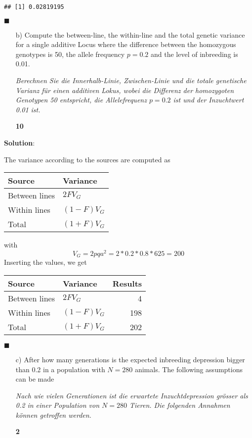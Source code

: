 \documentclass[
]{article}
\newcommand{\points}[1]
{\begin{flushright}\textbf{#1}\end{flushright}}
\newcommand{\solstart}
{\vspace{3ex}\textbf{Solution}:}
\newcommand{\solend}
{\vspace{2ex}$\blacksquare$}
\begin{document}
\begin{verbatim}
## [1] 0.02819195
\end{verbatim}

\solend

\clearpage
\pagebreak

\begin{enumerate}
\item[b)] Compute the between-line, the within-line and the total genetic variance for a single additive Locus where the difference between the homozygous genotypes is 50, the allele frequency $p = 0.2$ and the level of inbreeding is 0.01. 

\textit{Berechnen Sie die Innerhalb-Linie, Zwischen-Linie und die totale genetische Varianz für einen additiven Lokus, wobei die Differenz der homozygoten Genotypen 50 entspricht, die Allelefrequenz $p = 0.2$ ist und der Inzuchtwert 0.01 ist.}
\points{10}
\end{enumerate}

\solstart

The variance according to the sources are computed as

\begin{tabular}{ll}
\toprule
Source & Variance\\
\midrule
Between lines & $2FV_G$\\
Within lines & $(1-F)V_G$\\
Total & $(1+F)V_G$\\
\bottomrule
\end{tabular}

with \[V_G = 2pqa^2 = 2 * 0.2 * 0.8 * 625 = 200\] Inserting the values,
we get

\begin{tabular}{llr}
\toprule
Source & Variance & Results\\
\midrule
Between lines & $2FV_G$ & 4\\
Within lines & $(1-F)V_G$ & 198\\
Total & $(1+F)V_G$ & 202\\
\bottomrule
\end{tabular}

\solend

\clearpage
\pagebreak

\begin{enumerate}
\item[c)] After how many generations is the expected inbreeding depression bigger than 0.2 in a population with $N = 280$ animals. The following assumptions can be made

\textit{Nach wie vielen Generationen ist die erwartete Inzuchtdepression grösser als 0.2 in einer Population von $N = 280$ Tieren. Die folgenden Annahmen können getroffen werden.}
\points{2}
\end{enumerate}
\end{document}
